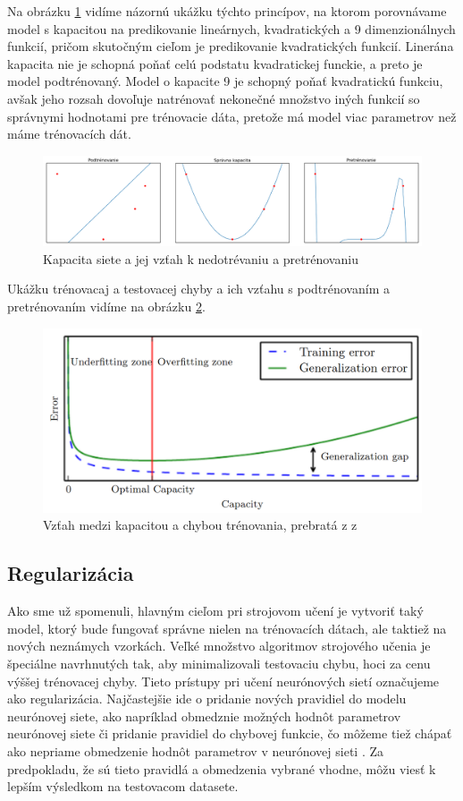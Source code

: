 \indent Na obrázku \ref{fig:capacity} vidíme názornú ukážku týchto princípov, na ktorom porovnávame model s kapacitou na predikovanie lineárnych, kvadratických a 9 dimenzionálnych funkcií, pričom skutočným cieľom je predikovanie kvadratických funkcií. Linerána kapacita nie je schopná poňať celú podstatu kvadratickej funckie, a preto je model podtrénovaný. Model o kapacite 9 je schopný poňať kvadratickú funkciu, avšak jeho rozsah dovoľuje natrénovať nekonečné množstvo iných funkcií so správnymi hodnotami pre trénovacie dáta, pretože má model viac parametrov než máme trénovacích dát. 

\begin{figure}[H]
	\centering
	\includegraphics[width=1\linewidth]{img/capacity}
	\caption{Kapacita siete a jej vzťah k nedotrévaniu a pretrénovaniu}
	\label{fig:capacity}
\end{figure}

\indent Ukážku trénovacaj a testovacej chyby a ich vzťahu s podtrénovaním a pretrénovaním vidíme na obrázku \ref{fig:errors}.

\begin{figure}[H]
	\centering
	\includegraphics[width=.5\linewidth]{img/errors}
	\caption{Vzťah medzi kapacitou a chybou trénovania,  prebratá z z\cite[s.~115]{goodfellow2016deep}}
	\label{fig:errors}
\end{figure}

\subsection{Regularizácia}
Ako sme už spomenuli, hlavným cieľom pri strojovom učení je vytvoriť taký model, ktorý bude fungovať správne nielen na trénovacích dátach, ale taktiež na nových neznámych vzorkách.
Veľké množstvo algoritmov strojového učenia je špeciálne navrhnutých tak, aby minimalizovali testovaciu chybu, hoci za cenu výššej trénovacej chyby.
Tieto prístupy pri učení neurónových sietí označujeme ako regularizácia\cite{nielsen2015chapter}.
Najčastejšie ide o pridanie nových pravidiel do modelu neurónovej siete, ako napríklad obmedznie možných hodnôt parametrov neurónovej siete či pridanie pravidiel do chybovej funkcie, čo môžeme tiež chápať ako nepriame obmedzenie hodnôt parametrov v neurónovej sieti \cite{goodfellow2016deep}.
Za predpokladu, že sú tieto pravidlá a obmedzenia vybrané vhodne, môžu viesť k lepším výsledkom na testovacom datasete.

